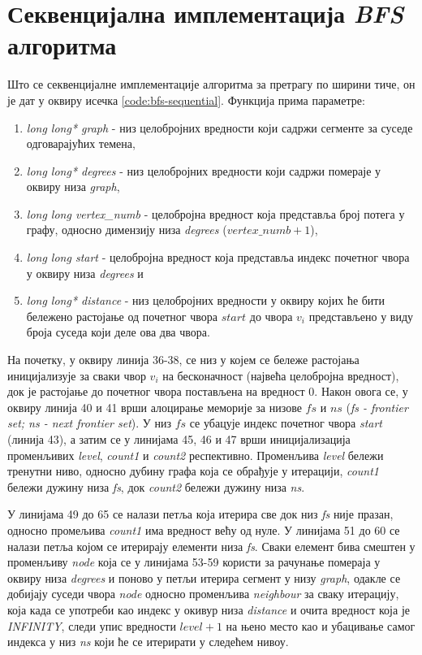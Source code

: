 \section{Секвенцијална имплементација \textit{BFS} алгоритма}
Што се секвенцијалне имплементације алгоритма за претрагу по ширини тиче, он је дат у оквиру исечка \ref{code:bfs-sequential}. Функција  прима параметре:
\begin{enumerate}
    \item \textit{long long* graph} - низ целобројних вредности који садржи сегменте за суседе одговарајућих темена,
    \item \textit{long long* degrees} - низ целобројних вредности који садржи помераје у оквиру низа \textit{graph},
    \item \textit{long long vertex\_numb} - целобројна вредност која представља број потега у графу, односно димензију низа \textit{degrees} ($\textit{vertex\_numb} + 1$),
    \item \textit{long long start} - целобројна вредност која представља индекс почетног чвора у оквиру низа \textit{degrees} и
    \item \textit{long long* distance} - низ целобројних вредности у оквиру којих ће бити бележено растојање од почетног чвора $start$ до чвора $v_i$ представљено у виду броја суседа који деле ова два чвора.
\end{enumerate}

\par
На почетку, у оквиру линија 36-38, се низ у којем се бележе растојања иницијализује за сваки чвор $v_i$ на бесконачност (највећа целобројна вредност), док је растојање до почетног чвора постављена на вредност $0$. Након овога се, у оквиру линија 40 и 41 врши алоцирање меморије за низове $fs$ и $ns$ (\textit{fs - frontier set; ns - next frontier set}). У низ $fs$ се убацује индекс почетног чвора \textit{start} (линија 43), а затим се у линијама 45, 46 и 47 врши иницијализација променљивих \textit{level}, \textit{count1} и \textit{count2} респективно. Променљива \textit{level} бележи тренутни ниво, односно дубину графа која се обрађује у итерацији, \textit{count1} бележи дужину низа \textit{fs}, док \textit{count2} бележи дужину низа \textit{ns}.

\par
У линијама 49 до 65 се налази петља која итерира све док низ \textit{fs} није празан, односно промељива \textit{count1} има вредност већу од нуле. У линијама 51 до 60 се налази петља којом се итерирају елементи низа \textit{fs}. Сваки елемент бива смештен у променљиву \textit{node} која се у линијама 53-59 користи за рачунање помераја у оквиру низа \textit{degrees} и поново у петљи итерира сегмент у низу \textit{graph}, одакле се добијају суседи чвора \textit{node} односно променљива \textit{neighbour} за сваку итерацију, која када се употреби као индекс у окивур низа \textit{distance} и очита вредност која је \textit{INFINITY}, следи упис вредности $\textit{level} + 1$ на њено место као и убацивање самог индекса у низ \textit{ns} који ће се итерирати у следећем нивоу.

